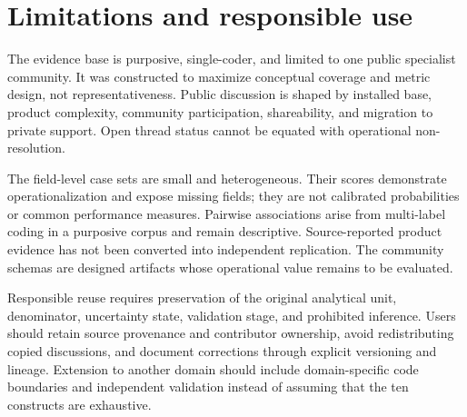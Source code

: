 \section{Limitations and responsible use}

The evidence base is purposive, single-coder, and limited to one public specialist community. It was constructed to maximize conceptual coverage and metric design, not representativeness. Public discussion is shaped by installed base, product complexity, community participation, shareability, and migration to private support. Open thread status cannot be equated with operational non-resolution.

The field-level case sets are small and heterogeneous. Their scores demonstrate operationalization and expose missing fields; they are not calibrated probabilities or common performance measures. Pairwise associations arise from multi-label coding in a purposive corpus and remain descriptive. Source-reported product evidence has not been converted into independent replication. The community schemas are designed artifacts whose operational value remains to be evaluated.

Responsible reuse requires preservation of the original analytical unit, denominator, uncertainty state, validation stage, and prohibited inference. Users should retain source provenance and contributor ownership, avoid redistributing copied discussions, and document corrections through explicit versioning and lineage. Extension to another domain should include domain-specific code boundaries and independent validation instead of assuming that the ten constructs are exhaustive.
